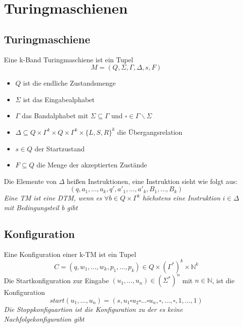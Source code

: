 \section{Turingmaschienen} 
\fancyhead[R]{}
\fancyhead[L]{}
\subsection{Turingmaschiene}
    Eine k-Band Turingmaschiene ist ein Tupel \[M=(Q,\Sigma,\Gamma,\Delta,s,F)\]
    \begin{itemize}
        \item \(Q\) ist die endliche Zustandsmenge
        \item \(\Sigma\) ist das Eingabealphabet
        \item \(\Gamma\) das Bandalphabet mit \(\Sigma\subseteq\Gamma\) und \(\square\in\Gamma\backslash\Sigma\)
        \item \(\Delta\subseteq Q\times\Gamma^k\times Q\times\Gamma^k\times {\{L,S,R\}}^k\) die Übergangsrelation
        \item \(s\in Q\) der Startzustand
        \item \(F\subseteq Q\) die Menge der akzeptierten Zustände
    \end{itemize}
    Die Elemente von \(\Delta\) heißen Instruktionen, eine Instruktion sieht wie folgt aus:
    \[(q,a_1,\dots,a_k,q',a'_1,\dots,a'_k,B_1,\dots,B_k)\]
    \textit{Eine TM ist eine DTM, wenn es \(\forall b\in Q\times\Gamma^k\) höchstens eine Instruktion \(i\in \Delta\) mit Bedingungsteil b gibt}
\subsection{Konfiguration}
    Eine Konfiguration einer k-TM ist ein Tupel 
    \[C=(q,w_1,\dots,w_k,p_1,\dots,p_k)\in Q \times (\Gamma^*)^k \times \mathbb{N}^k\]
    Die Startkonfiguration zur Eingabe \((u_1,\dots,u_n)\in(\Sigma^*)^n\) mit \(n\in\mathbb{N}\), ist die Konfiguration
    \[start(u_1,\dots,u_n)=(s,u_1\square u_2\square\dots\square u_n,\square,\dots,\square,1,\dots,1)\]
    \textit{Die Stoppkonfiguartion ist die Konfiguration zu der es keine Nachfolgekonfiguration gibt}
